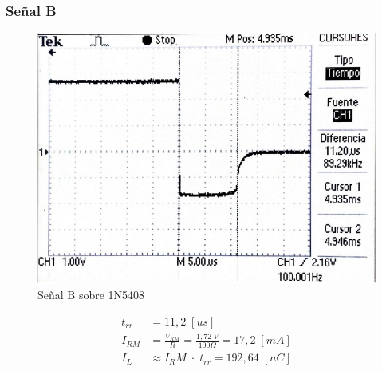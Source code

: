\documentclass{article}
\begin{document}
\subsubsection{Señal B}
\begin{figure}[h!]
 \begin{center}
	\includegraphics[scale=0.5]{imagenes/1N5408_B.jpg} 
	\caption{Señal B sobre 1N5408}
 \end{center}
\end{figure}
%
\begin{align*}
	t_{rr} &= 11,2 \; [us] \\
	I_{RM}	&= \frac{V_{RM}}{R} = \frac{1,72 \; V}{100 \Omega} = 17,2 \; [mA]\\
	I_L	&\approx {I_RM} \; \cdot \; t_{rr} = 192,64 \; [nC]
\end{align*}
%
\end{document}
